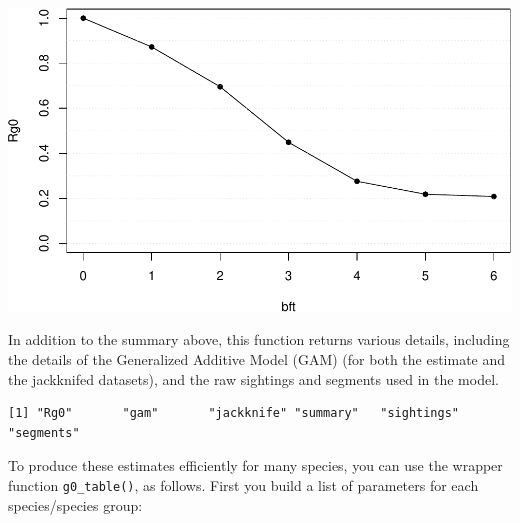 \documentclass[
]{book}
\newenvironment{Shaded}{\begin{snugshade}}{\end{snugshade}}
\newcommand{\DataTypeTok}[1]{\textcolor[rgb]{0.13,0.29,0.53}{#1}}
\newcommand{\DecValTok}[1]{\textcolor[rgb]{0.00,0.00,0.81}{#1}}
\newcommand{\KeywordTok}[1]{\textcolor[rgb]{0.13,0.29,0.53}{\textbf{#1}}}
\newcommand{\NormalTok}[1]{#1}
\newcommand{\OperatorTok}[1]{\textcolor[rgb]{0.81,0.36,0.00}{\textbf{#1}}}
\newcommand{\StringTok}[1]{\textcolor[rgb]{0.31,0.60,0.02}{#1}}
\begin{document}
\begin{Shaded}
\end{Shaded}

\includegraphics{figures/unnamed-chunk-142-1.pdf}

In addition to the summary above, this function returns various details, including the details of the Generalized Additive Model (GAM) (for both the estimate and the jackknifed datasets), and the raw sightings and segments used in the model.

\begin{verbatim}
[1] "Rg0"       "gam"       "jackknife" "summary"   "sightings" "segments" 
\end{verbatim}

To produce these estimates efficiently for many species, you can use the wrapper function \texttt{g0\_table()}, as follows. First you build a list of parameters for each species/species group:
\end{document}
